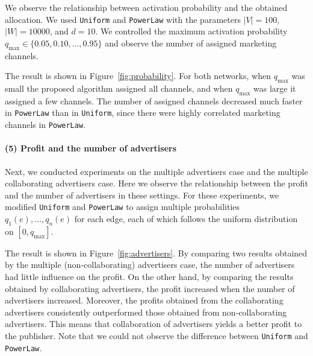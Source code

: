 \documentclass[letterpaper]{article}
\theoremstyle{definition}
\begin{document}
We observe the relationship between activation probability and the obtained allocation.
We used \texttt{Uniform} and \texttt{PowerLaw} with the parameters $|V| = 100$,  $|W| = 10000$, and $d = 10$.
We controlled the maximum activation probability $q_{\text{max}} \in \{0.05, 0.10, \ldots, 0.95\}$ and observe the number of assigned marketing channels.

The result is shown in Figure~\ref{fig:probability}.
For both networks, when $q_{\text{max}}$ was small the proposed algorithm assigned all channels, and when $q_{\text{max}}$ was large it assigned a few channels.
The number of assigned channels decreased much faster in \texttt{PowerLaw} than in \texttt{Uniform}, since there were highly correlated marketing channels in \texttt{PowerLaw}.

\paragraph{(5) Profit and the number of advertisers}

Next, we conducted experiments on the multiple advertisers case and the multiple collaborating advertisers case.
Here we observe the relationship between the profit and the number of advertisers in these settings.
For these experiments, we modified \texttt{Uniform} and \texttt{PowerLaw}
to assign multiple probabilities $q_1(e), \ldots, q_n(e)$ for each edge, each of which follows the uniform distribution on $[0, q_{\text{max}}]$.

The result is shown in Figure~\ref{fig:advertisers}.
By comparing two results obtained by the multiple (non-collaborating) advertisers case, the number of advertisers had little influence on the profit.
On the other hand, by comparing the results obtained by collaborating advertisers, the profit increased when the number of advertisers increased.
Moreover, the profits obtained from the collaborating advertisers consistently outperformed those obtained from non-collaborating advertisers.
This means that collaboration of advertisers yields a better profit to the publisher.
Note that we could not observe the difference between \texttt{Uniform} and \texttt{PowerLaw}.
\end{document}

